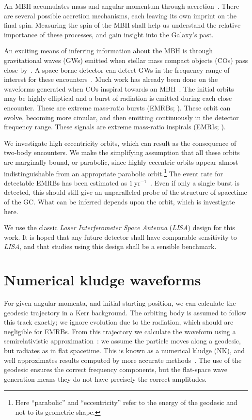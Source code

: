 \documentclass[11pt,twoside]{article}
\begin{document}
An MBH accumulates mass and angular momentum through accretion~\citep{Volonteri2010}. There are several possible accretion mechanisms, each leaving its own imprint on the final spin. Measuring the spin of the MBH shall help us understand the relative importance of these processes, and gain insight into the Galaxy's past.

An exciting means of inferring information about the MBH is through gravitational waves (GWs) emitted when stellar mass compact objects (COs) pass close by~\citep{Sathyaprakash2009}. A space-borne detector can detect GWs in the frequency range of interest for these encounters~\citep{Danzmann2003, Amaro-Seoane2012a}. Much work has already been done on the waveforms generated when COs inspiral towards an MBH~\citep{Glampedakis2005, Barack2009}. The initial orbits may be highly elliptical and a burst of radiation is emitted during each close encounter. These are extreme mass-ratio bursts (EMRBs; \citealt*{Rubbo2006}). These orbit can evolve, becoming more circular, and then emitting continuously in the detector frequency range. These signals are extreme mass-ratio inspirals (EMRIs; \citealt{Amaro-Seoane2007}).

We investigate high eccentricity orbits, which can result as the consequence of two-body encounters. We make the simplifying assumption that all these orbits are marginally bound, or parabolic, since highly eccentric orbits appear almost indistinguishable from an appropriate parabolic orbit.\footnote{Here ``parabolic'' and ``eccentricity'' refer to the energy of the geodesic and not to its geometric shape.} The event rate for detectable EMRBs has been estimated as $1~\mathrm{yr^{-1}}$~\citep*{Hopman2007}. Even if only a single burst is detected, this should still give an unparalleled probe of the structure of spacetime of the GC. What can be inferred depends upon the orbit, which is investigate here. 

We use the classic \textit{Laser Interferometer Space Antenna} (\textit{LISA}) design for this work. It is hoped that any future detector shall have comparable sensitivity to \textit{LISA}, and that studies using this design shall be a sensible benchmark.

\section{Numerical kludge waveforms}

For given angular momenta, and initial starting position, we can calculate the geodesic trajectory in a Kerr background. The orbiting body is assumed to follow this track exactly; we ignore evolution due to the radiation, which should are negligible for EMRBs. From this trajectory we calculate the waveform using a semirelativistic approximation~\citep{Ruffini1981}: we assume the particle moves along a geodesic, but radiates as in flat spacetime. This is known as a numerical kludge (NK), and well approximates results computed by more accurate methods~\citep{Babak2007}. The use of the geodesic ensures the correct frequency components, but the flat-space wave generation means they do not have precisely the correct amplitudes.
\end{document}
